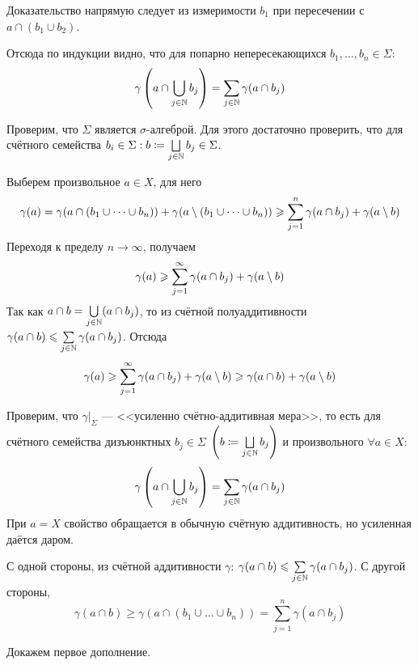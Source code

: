 \documentclass[a4paper]{report}
\begin{document}
{{            Доказательство напрямую следует из измеримости $b_1$ при пересечении с $a \cap (b_1 \cup b_2)$.

            Отсюда по индукции видно, что для попарно непересекающихся $b_1, \dots, b_n \in \Sigma$:
            \[\gamma\left( a \cap \bigcup\limits_{j \in \mathbb{N}}b_j\right) = \sum\limits_{j \in \mathbb{N}}\gamma(a \cap b_j)\]

            \item Проверим, что $\Sigma$ является $\sigma$-алгеброй.
            Для этого достаточно проверить, что для счётного семейства $b_i \in \Sigma: b \coloneqq \bigsqcup\limits_{j \in \mathbb{N}}b_j \in \Sigma$.


            Выберем произвольное $a \in X$, для него
            \[\gamma(a) = \gamma(a \cap (b_1 \cup \dots \cup b_n)) + \gamma(a \setminus (b_1 \cup \dots \cup b_n)) \geqslant \sum\limits_{j = 1}^{n}\gamma(a \cap b_j) + \gamma(a \setminus b)\]
            Переходя к пределу $n \to \infty$, получаем
            \[\gamma(a) \geqslant \sum\limits_{j = 1}^{\infty}\gamma(a \cap b_j) + \gamma(a \setminus b)\]
            Так как $a \cap b = \bigcup\limits_{j \in \mathbb{N}}(a \cap b_j)$, то из счётной полуаддитивности $\gamma(a \cap b) \leqslant \sum\limits_{j \in \mathbb{N}}\gamma(a \cap b_j)$.
            Отсюда
            \[\gamma(a) \geqslant \sum\limits_{j = 1}^{\infty}\gamma(a \cap b_j) + \gamma(a \setminus b) \geqslant \gamma(a \cap b) + \gamma(a \setminus b)\]
            \item Проверим, что $\gamma\big|_\Sigma$ --- <<усиленно счётно-аддитивная мера>>, то есть для счётного семейства дизъюнктных $b_j \in \Sigma$ $\left(b \coloneqq \bigsqcup\limits_{j \in \mathbb{N}}b_j\right)$ и произвольного $\forall a \in X$:
            \[\gamma\left( a\cap\bigcup\limits_{j \in \mathbb{N}}b_j\right) = \sum\limits_{j \in \mathbb{N}}\gamma(a \cap b_j)\]
            При $a = X$ свойство обращается в обычную счётную аддитивность, но усиленная даётся даром.

            С одной стороны, из счётной аддитивности $\gamma$: $\gamma(a \cap b) \leqslant \sum\limits_{j \in \mathbb{N}}\gamma(a \cap b_j)$.
            С другой стороны, \[\gamma( a\cap b) \ge \gamma(a \cap (b_1 \cup \dots \cup b_n)) = \sum\limits_{j = 1}^{n}\gamma(a \cap b_j)\]
            \item Докажем первое дополнение.

}}
\end{document}

